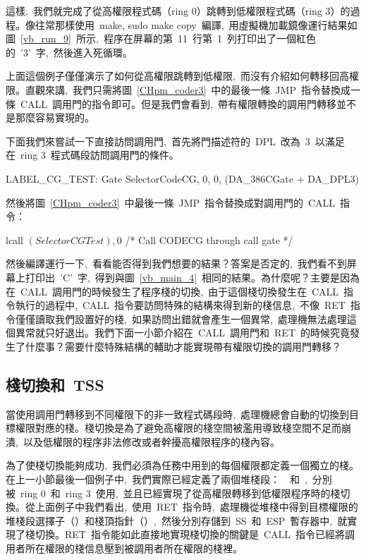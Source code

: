 這樣,~我們就完成了從高權限程式碼（ring 0）跳轉到低權限程式碼（ring 3）的過程。像往常那樣使用~make, sudo make copy~編譯,~用虛擬機加載鏡像運行結果如圖~\ref{vb_run_9}~所示,~程序在屏幕的第~11~行第~1~列打印出了一個紅色的~'3'~字,~然後進入死循環。


上面這個例子僅僅演示了如何從高權限跳轉到低權限,~而沒有介紹如何轉移回高權限。直觀來講,~我們只需將圖~\ref{CHpm_coder3}~中的最後一條~JMP~指令替換成一條~CALL~調用門的指令即可。但是我們會看到,~帶有權限轉換的調用門轉移並不是那麼容易實現的。

下面我們來嘗試一下直接訪問調用門,~首先將門描述符的~DPL~改為~3~以滿足在~ring 3~程式碼段訪問調用門的條件。

\begin{Command}
LABEL_CG_TEST:      Gate    SelectorCodeCG, 0, 0, (DA_386CGate + DA_DPL3)
\end{Command}

然後將圖~\ref{CHpm_coder3}~中最後一條~JMP~指令替換成對調用門的~CALL~指令：

\begin{Command}
lcall   $(SelectorCGTest), $0  /* Call CODECG through call gate */
\end{Command}

然後編譯運行一下,~看看能否得到我們想要的結果？答案是否定的,~我們看不到屏幕上打印出~'C'~字,~得到與圖~\ref{vb_main_4}~相同的結果。為什麼呢？主要是因為在~CALL~調用門的時候發生了程序棧的切換,~由于這個棧切換發生在~CALL~指令執行的過程中,~CALL~指令要訪問特殊的結構來得到新的棧信息,~不像~RET~指令僅僅讀取我們設置好的棧,~如果訪問出錯就會產生一個異常,~處理機無法處理這個異常就只好退出。我們下面一小節介紹在~CALL~調用門和~RET~的時候究竟發生了什麼事？需要什麼特殊結構的輔助才能實現帶有權限切換的調用門轉移？

\subsection{棧切換和~TSS}

當使用調用門轉移到不同權限下的非一致程式碼段時,~處理機總會自動的切換到目標權限對應的棧。棧切換是為了避免高權限的棧空間被濫用導致棧空間不足而崩潰,~以及低權限的程序非法修改或者幹擾高權限程序的棧內容。

為了使棧切換能夠成功,~我們必須為任務中用到的每個權限都定義一個獨立的棧。在上一小節最後一個例子中,~我們實際已經定義了兩個堆棧段：~~和~,~分別被~ring 0~和~ring 3~使用,~並且已經實現了從高權限轉移到低權限程序時的棧切換。從上面例子中我們看出,~使用~RET~指令時,~處理機從堆棧中得到目標權限的堆棧段選擇子（）和棧頂指針（）,~然後分別存儲到~SS~和~ESP~暫存器中,~就實現了棧切換。RET~指令能如此直接地實現棧切換的關鍵是~CALL~指令已經將調用者所在權限的棧信息壓到被調用者所在權限的棧裡。

